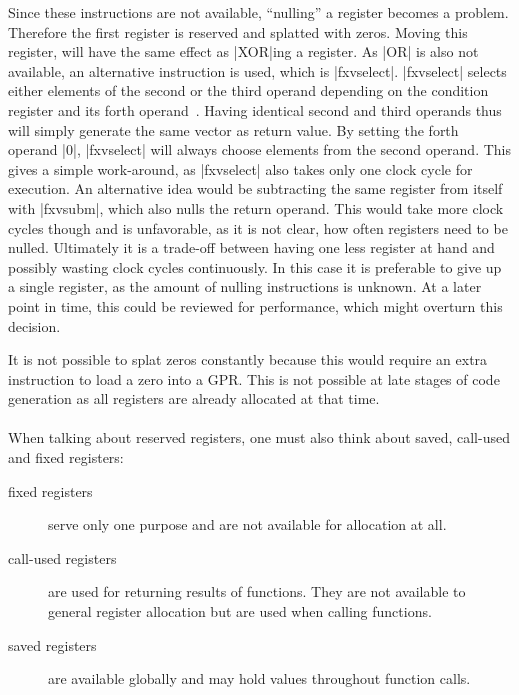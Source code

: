 Since these instructions are not available, ``nulling'' a register becomes a problem.
Therefore the first register is reserved and splatted with zeros.
Moving this register, will have the same effect as |XOR|ing a register.
As |OR| is also not available, an alternative instruction is used, which is |fxvselect|.
|fxvselect| selects either elements of the second or the third operand depending on the condition register and its forth operand~\citep[ch.~5]{nuxmanual}.
Having identical second and third operands thus will simply generate the same vector as return value.
By setting the forth operand |0|, |fxvselect| will always choose elements from the second operand.
This gives a simple work-around, as |fxvselect| also takes only one clock cycle for execution.
An alternative idea would be subtracting the same register from itself with |fxvsubm|, which also nulls the return operand.
This would take more clock cycles though and is unfavorable, as it is not clear, how often registers need to be nulled.
Ultimately it is a trade-off between having one less register at hand and possibly wasting clock cycles continuously.
In this case it is preferable to give up a single register, as the amount of nulling instructions is unknown.
At a later point in time, this could be reviewed for performance, which might overturn this decision.

It is not possible to splat zeros constantly because this would require an extra instruction to load a zero into a \ac{GPR}.
This is not possible at late stages of code generation as all registers are already allocated at that time.
\\
\\
When talking about reserved registers, one must also think about saved, call-used and fixed registers:
\begin{description}
    \item[fixed registers] serve only one purpose and are not available for allocation at all.
    \item[call-used registers] are used for returning results of functions. They are not available to general register allocation but are used when calling functions.
    \item[saved registers] are available globally and may hold values throughout function calls.
\end{description}

